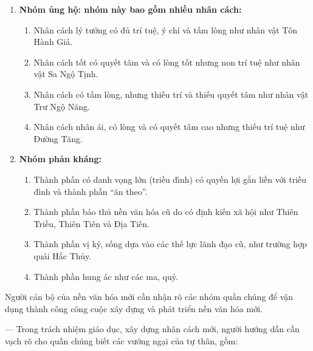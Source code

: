 \begin{enumerate}[label=\itshape\arabic*\upshape)]

    \item {\bf Nhóm ủng hộ: nhóm này bao gồm nhiều nhân cách:}

    \begin{enumerate}[label=\itshape\alph*\upshape/]

        \item Nhân cách lý tưởng có đủ trí tuệ, ý chí và tấm lòng như nhân vật Tôn Hành Giả.

        \item Nhân cách tốt có quyết tâm và có lòng tốt nhưng non trí tuệ như nhân vật Sa Ngộ Tịnh.

        \item Nhân cách có tấm lòng, nhưng thiếu trí và thiếu quyết tâm như nhân vật Trư Ngộ Năng.

        \item Nhân cách nhân ái, có lòng và có quyết tâm cao nhưng thiếu trí tuệ như Đường Tăng.
    \end{enumerate}

    \item {\bf Nhóm phản kháng:}

    \begin{enumerate}[label=\itshape\alph*\upshape/]

        \item Thành phần có danh vọng lớn (triều đình) có quyền lợi gắn liền với triều đình và thành phần ``ăn theo''.

        \item Thành phần bảo thủ nền văn hóa cũ do có định kiến xã hội như Thiên Triều, Thiên Tiên và Địa Tiên.

        \item Thành phần vị kỷ, sống dựa vào các thế lực lãnh đạo cũ, như trường hợp quái Hắc Thủy.

        \item Thành phần hung ác như các ma, quỷ.
    \end{enumerate}
\end{enumerate}

Người cán bộ của nền văn hóa mới cần nhận rõ các nhóm quần chúng để vận dụng thành công công cuộc xây dựng và phát triển nền văn hóa mới.

--- Trong trách nhiệm giáo dục, xây dựng nhân cách mới, người hướng dẫn cần vạch rõ cho quần chúng biết các vướng ngại của tự thân, gồm:

